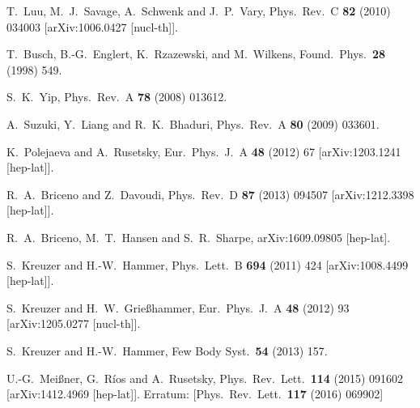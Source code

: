 \documentclass[aps,singlecolumn,superscriptaddress,nofootinbib,tightenlines,
preprintnumbers,showkeys]{revtex4-1}
\begin{document}
\begin{thebibliography}{99}
  T.~Luu, M.~J.~Savage, A.~Schwenk and J.~P.~Vary,
  Phys.\ Rev.\ C {\bf 82} (2010) 034003
  [arXiv:1006.0427 [nucl-th]].

  T.~Busch, B.-G.~Englert, K.~Rzazewski, and M.~Wilkens,
  Found.\ Phys.\ {\bf 28} (1998) 549.

  S.~K.~Yip,
  Phys.\ Rev.\ A {\bf 78} (2008) 013612.

  A.~Suzuki, Y.~Liang and R.~K.~Bhaduri,
  Phys.\ Rev.\ A {\bf 80} (2009) 033601.

  K.~Polejaeva and A.~Rusetsky,
  Eur.\ Phys.\ J.\ A {\bf 48} (2012) 67
  [arXiv:1203.1241 [hep-lat]].

  R.~A.~Briceno and Z.~Davoudi,
  Phys.\ Rev.\ D {\bf 87} (2013) 094507
  [arXiv:1212.3398 [hep-lat]].

  R.~A.~Briceno, M.~T.~Hansen and S.~R.~Sharpe,
  arXiv:1609.09805 [hep-lat].

  S.~Kreuzer and H.-W.~Hammer,
  Phys.\ Lett.\ B {\bf 694} (2011) 424
  [arXiv:1008.4499 [hep-lat]].

  S.~Kreuzer and H.~W.~Grießhammer,
  Eur.\ Phys.\ J.\ A {\bf 48} (2012) 93
  [arXiv:1205.0277 [nucl-th]].

  S.~Kreuzer and H.-W.~Hammer,
  Few Body Syst.\ {\bf 54} (2013) 157.

  U.-G.~Meißner, G.~Ríos and A.~Rusetsky,
  Phys.\ Rev.\ Lett.\ {\bf 114} (2015) 091602
  [arXiv:1412.4969 [hep-lat]].
  Erratum: [Phys.\ Rev.\ Lett.\ {\bf 117} (2016) 069902]


\end{thebibliography}
\end{document}
